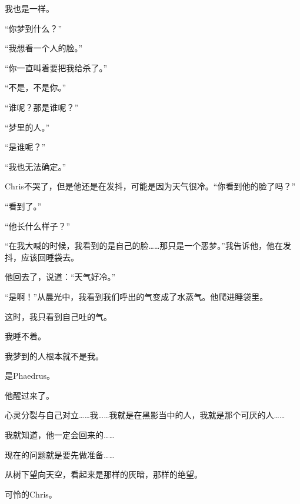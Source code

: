 \documentclass[UTF8]{article}
\begin{document}
\par 我也是一样。
\par “你梦到什么？”
\par “我想看一个人的脸。”
\par “你一直叫着要把我给杀了。”
\par “不是，不是你。”
\par “谁呢？那是谁呢？”
\par “梦里的人。”
\par “是谁呢？”
\par “我也无法确定。”
\par Chris不哭了，但是他还是在发抖，可能是因为天气很冷。“你看到他的脸了吗？”
\par “看到了。”
\par “他长什么样子？”
\par “在我大喊的时候，我看到的是自己的脸……那只是一个恶梦。”我告诉他，他在发抖，应该回睡袋去。
\par 他回去了，说道：“天气好冷。”
\par “是啊！”从晨光中，我看到我们呼出的气变成了水蒸气。他爬进睡袋里。
\par 这时，我只看到自己吐的气。
\par 我睡不着。
\par 我梦到的人根本就不是我。
\par 是Phaedrus。
\par 他醒过来了。
\par 心灵分裂与自己对立……我……我就是在黑影当中的人，我就是那个可厌的人……
\par 我就知道，他一定会回来的……
\par 现在的问题就是要先做准备……
\par 从树下望向天空，看起来是那样的灰暗，那样的绝望。
\par 可怜的Chris。
\end{document}
